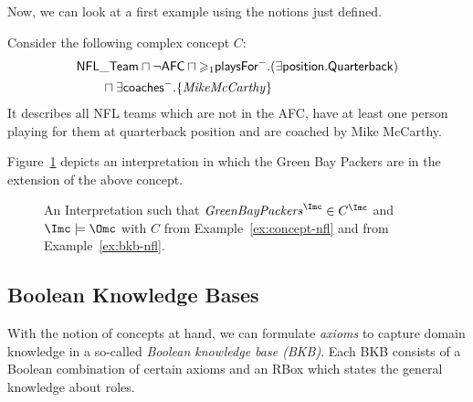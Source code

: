 Now, we can look at a first example using the notions just defined.

\begin{example}\label{ex:concept-nfl}
  Consider the following complex concept $C$:
  \begin{align*}
    & \mathsf{NFL\_{}Team} \sqcap \lnot \mathsf{AFC} \sqcap
    {\geqslant_{1}}\mathsf{playsFor}^{-}.(\exists\mathsf{position}.\mathsf{Quarterback}) \\
    & \qquad\sqcap \exists\mathsf{coaches}^{-}.\{\text{\textit{MikeMcCarthy}}\}
  \end{align*}
  It describes all NFL teams which are not in the AFC, have at least one person playing for them at
  quarterback position and are coached by Mike McCarthy.

  Figure~\ref{fig:example-concept} depicts an interpretation in which the Green Bay Packers are in the extension of the above concept.
\end{example}
\begin{figure}
  \centering
  \caption{An Interpretation \I such that $\text{\textit{GreenBayPackers}}^{\I} \in C^{\I}$ and
    $\I\models\Omc$ with $C$ from Example~\ref{ex:concept-nfl} and \Omc from Example~\ref{ex:bkb-nfl}.}
  \label{fig:example-concept}
\end{figure}



\subsection{Boolean Knowledge Bases}
\label{sec:dl-axioms}

With the notion of concepts at hand, we can formulate \emph{axioms} to capture domain knowledge in a
so-called \emph{Boolean knowledge base (BKB)}. Each BKB consists of a Boolean combination of certain
axioms and an RBox which states the general knowledge about roles.

